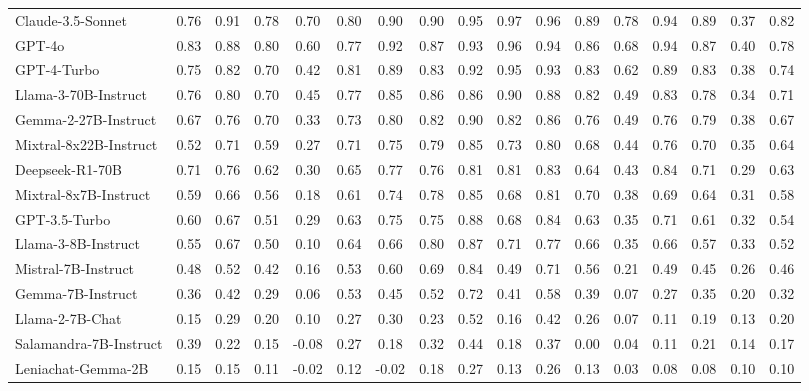 \begin{table*}[ht]
{\begin{tabular}{lcccccccccccccccc}
Claude-3.5-Sonnet & 0.76 & 0.91 & 0.78 & 0.70 & 0.80 & 0.90 & 0.90 & 0.95 & 0.97 & 0.96 & 0.89 & 0.78 & 0.94 & 0.89 & 0.37 & 0.82 \\
GPT-4o & 0.83 & 0.88 & 0.80 & 0.60 & 0.77 & 0.92 & 0.87 & 0.93 & 0.96 & 0.94 & 0.86 & 0.68 & 0.94 & 0.87 & 0.40 & 0.78 \\
GPT-4-Turbo & 0.75 & 0.82 & 0.70 & 0.42 & 0.81 & 0.89 & 0.83 & 0.92 & 0.95 & 0.93 & 0.83 & 0.62 & 0.89 & 0.83 & 0.38 & 0.74 \\
Llama-3-70B-Instruct & 0.76 & 0.80 & 0.70 & 0.45 & 0.77 & 0.85 & 0.86 & 0.86 & 0.90 & 0.88 & 0.82 & 0.49 & 0.83 & 0.78 & 0.34 & 0.71 \\
Gemma-2-27B-Instruct & 0.67 & 0.76 & 0.70 & 0.33 & 0.73 & 0.80 & 0.82 & 0.90 & 0.82 & 0.86 & 0.76 & 0.49 & 0.76 & 0.79 & 0.38 & 0.67 \\
Mixtral-8x22B-Instruct & 0.52 & 0.71 & 0.59 & 0.27 & 0.71 & 0.75 & 0.79 & 0.85 & 0.73 & 0.80 & 0.68 & 0.44 & 0.76 & 0.70 & 0.35 & 0.64 \\
Deepseek-R1-70B & 0.71 & 0.76 & 0.62 & 0.30 & 0.65 & 0.77 & 0.76 & 0.81 & 0.81 & 0.83 & 0.64 & 0.43 & 0.84 & 0.71 & 0.29 & 0.63 \\
Mixtral-8x7B-Instruct & 0.59 & 0.66 & 0.56 & 0.18 & 0.61 & 0.74 & 0.78 & 0.85 & 0.68 & 0.81 & 0.70 & 0.38 & 0.69 & 0.64 & 0.31 & 0.58 \\
GPT-3.5-Turbo & 0.60 & 0.67 & 0.51 & 0.29 & 0.63 & 0.75 & 0.75 & 0.88 & 0.68 & 0.84 & 0.63 & 0.35 & 0.71 & 0.61 & 0.32 & 0.54 \\
Llama-3-8B-Instruct & 0.55 & 0.67 & 0.50 & 0.10 & 0.64 & 0.66 & 0.80 & 0.87 & 0.71 & 0.77 & 0.66 & 0.35 & 0.66 & 0.57 & 0.33 & 0.52 \\
Mistral-7B-Instruct & 0.48 & 0.52 & 0.42 & 0.16 & 0.53 & 0.60 & 0.69 & 0.84 & 0.49 & 0.71 & 0.56 & 0.21 & 0.49 & 0.45 & 0.26 & 0.46 \\
Gemma-7B-Instruct & 0.36 & 0.42 & 0.29 & 0.06 & 0.53 & 0.45 & 0.52 & 0.72 & 0.41 & 0.58 & 0.39 & 0.07 & 0.27 & 0.35 & 0.20 & 0.32 \\
Llama-2-7B-Chat & 0.15 & 0.29 & 0.20 & 0.10 & 0.27 & 0.30 & 0.23 & 0.52 & 0.16 & 0.42 & 0.26 & 0.07 & 0.11 & 0.19 & 0.13 & 0.20 \\
Salamandra-7B-Instruct & 0.39 & 0.22 & 0.15 & -0.08 & 0.27 & 0.18 & 0.32 & 0.44 & 0.18 & 0.37 & 0.00 & 0.04 & 0.11 & 0.21 & 0.14 & 0.17 \\
Leniachat-Gemma-2B & 0.15 & 0.15 & 0.11 & -0.02 & 0.12 & -0.02 & 0.18 & 0.27 & 0.13 & 0.26 & 0.13 & 0.03 & 0.08 & 0.08 & 0.10 & 0.10 \\
\midrule

\end{tabular}}
\end{table*}
